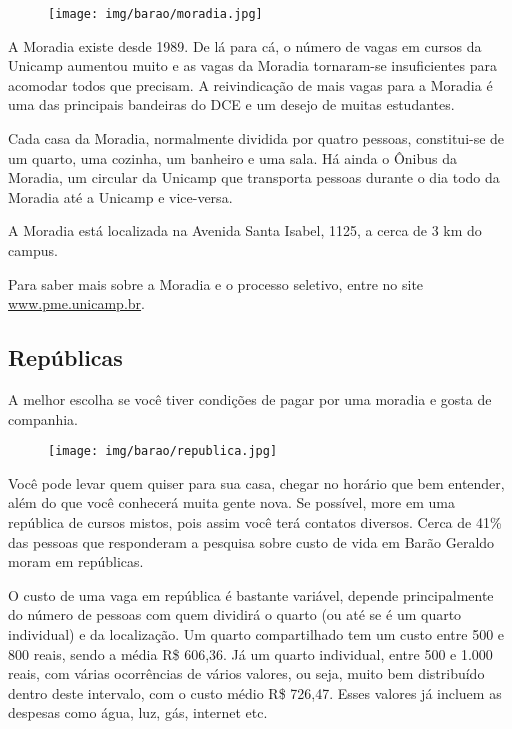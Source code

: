 \begin{figure}[h!]
    \centering
    \texttt{[image: img/barao/moradia.jpg]}
\end{figure}

A Moradia existe desde 1989. De lá para cá, o número de vagas em cursos da
Unicamp aumentou muito e as vagas da Moradia tornaram-se insuficientes para
acomodar todos que precisam. A reivindicação de mais vagas para a Moradia é uma
das principais bandeiras do DCE e um desejo de muitas estudantes.

Cada casa da Moradia, normalmente dividida por quatro pessoas, constitui-se de
um quarto, uma cozinha, um banheiro e uma sala. Há ainda o Ônibus da Moradia,
um circular da Unicamp que transporta pessoas durante o dia todo da Moradia até
a Unicamp e vice-versa.

A Moradia está localizada na Avenida Santa Isabel, 1125, a cerca de 3 km do
campus.

Para saber mais sobre a Moradia e o processo seletivo, entre no site
\url{www.pme.unicamp.br}.

\subsection{Repúblicas}

A melhor escolha se você tiver condições de pagar por uma moradia e gosta de
companhia.

\begin{figure}[h!]
    \centering
    \texttt{[image: img/barao/republica.jpg]}
\end{figure}

Você pode levar quem quiser para sua casa, chegar no horário que bem entender,
além do que você conhecerá muita gente nova. Se possível, more em uma república
de cursos mistos, pois assim você terá contatos diversos. Cerca de 41\% das
pessoas que responderam a pesquisa sobre custo de vida em Barão Geraldo moram
em repúblicas.

O custo de uma vaga em república é bastante variável, depende principalmente do
número de pessoas com quem dividirá o quarto (ou até se é um quarto individual)
e da localização. Um quarto compartilhado tem um custo entre 500 e 800 reais,
sendo a média R\$ 606,36. Já um quarto individual, entre 500 e 1.000 reais,
com várias ocorrências de vários valores, ou seja, muito bem distribuído dentro
deste intervalo, com o custo médio R\$ 726,47. Esses valores já incluem as
despesas como água, luz, gás, internet etc.

